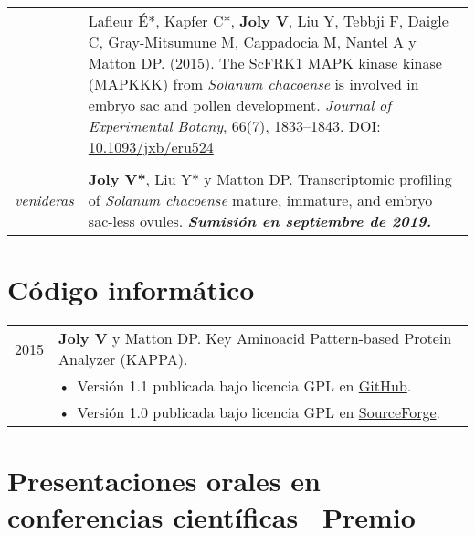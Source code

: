 \documentclass[letterpaper,12pt]{article}
\begin{document}
\begin{tabularx}{\textwidth}{@{}r|X@{}}
& Lafleur É*, Kapfer C*, \textbf{Joly V}, Liu Y, Tebbji F, Daigle C,
  Gray-Mitsumune M, Cappadocia M, Nantel A y Matton DP. (2015).
  The ScFRK1 MAPK kinase kinase (MAPKKK) from \emph{Solanum chacoense} is
  involved in embryo sac and pollen development.
  \emph{Journal of Experimental Botany}, 66(7), 1833--1843.
  DOI: \href{http://doi.org/10.1093/jxb/eru524}{10.1093/jxb/eru524}
  \\

\multicolumn{2}{c}{} \\

{\em venideras}
& \textbf{Joly V*}, Liu Y* y Matton DP.
  Transcriptomic profiling of \emph{Solanum chacoense} mature, immature, and
  embryo sac-less ovules.
  {\bfseries\em Sumisión en septiembre de 2019.}
  \\

\end{tabularx}

\vspace{6mm}

\section[Código informático]{Código informático}

\begin{tabularx}{\textwidth}{@{}r|X@{}}

2015
& \textbf{Joly V} y Matton DP. Key Aminoacid Pattern-based Protein Analyzer
  (KAPPA). \\
& \small \hspace{1.5mm} •~Versión 1.1 publicada bajo licencia GPL en
  \href{https://github.com/valentinjoly/kappa-1.1}{GitHub}. \\
& \small \hspace{1.5mm} •~Versión 1.0 publicada bajo licencia GPL en
  \href{https://sourceforge.net/projects/kappa-sequence-search/}{SourceForge}.
  \\

\end{tabularx}

\newpage

\section[Presentaciones orales]{Presentaciones orales
         \small en conferencias científicas \hfill {\mdseries\faStar}~Premio}
\end{document}
